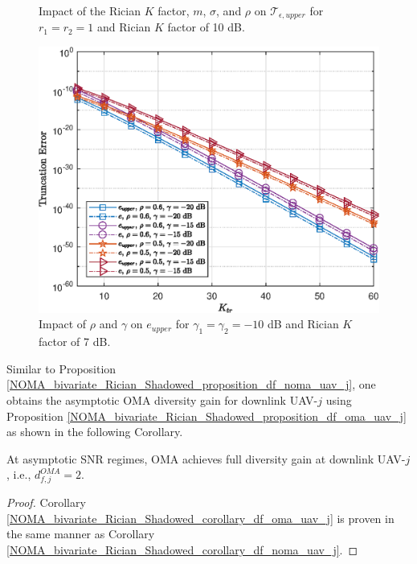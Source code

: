 \begin{figure}[t]
{\label{fig:NOMA_bivariate_Rician_Shadowed_rho_truncation_error}} \vspace{0.1cm}
\caption{Impact of the Rician $K$ factor, $m$, $\sigma$, and $\rho$ on $\mathcal{T}_{\epsilon,upper}$ for $r_1 = r_2 = 1$ and Rician $K$ factor of 10 dB.}
\label{fig:NOMA_bivariate_Rician_Shadowed_truncation_error}
\end{figure}

\begin{figure} [t] 
\centering
\vspace{0.5cm}
\includegraphics [width=0.45\columnwidth]{chap8_fig/rho_gamma_CDF_truncation_error.eps} 
\caption{Impact of $\rho$ and $\gamma$ on $e_{upper}$ for $\gamma_1 = \gamma_2 = -10$ dB and Rician $K$ factor of 7 dB.}
\label{fig:NOMA_bivariate_Rician_Shadowed_rho_gamma_CDF_truncation_error}
\end{figure}

Similar to Proposition \ref{NOMA_bivariate_Rician_Shadowed_proposition_df_noma_uav_j}, one obtains the asymptotic OMA diversity gain for downlink UAV-$j$ using Proposition \ref{NOMA_bivariate_Rician_Shadowed_proposition_df_oma_uav_j} as shown in the following Corollary.
\begin{corollary} \label{NOMA_bivariate_Rician_Shadowed_corollary_df_oma_uav_j}
At asymptotic SNR regimes, OMA achieves full diversity gain at downlink UAV-$j$, i.e., $d_{f,j}^{OMA} = 2$.
\end{corollary}
\begin{proof}
Corollary \ref{NOMA_bivariate_Rician_Shadowed_corollary_df_oma_uav_j} is proven in the same manner as Corollary \ref{NOMA_bivariate_Rician_Shadowed_corollary_df_noma_uav_j}. 
\end{proof}

